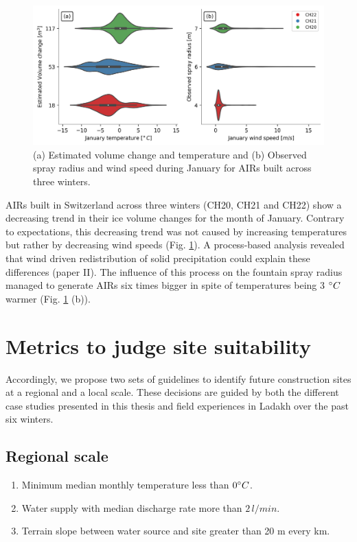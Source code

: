 \begin{figure}[htb]
	\centering
	\includegraphics[width=\textwidth]{figs/CH_diffs.jpg}
	\caption{(a) Estimated volume change and temperature and (b) Observed spray radius and wind speed
		during January for \ac{AIRs} built across three winters. }
	\label{fig:CH_diffs}
\end{figure}

\ac{AIRs} built in Switzerland across three winters (CH20, CH21 and CH22) show a decreasing trend in their ice volume
changes for the month of January. Contrary to expectations, this decreasing trend was not caused by increasing
temperatures but rather by decreasing wind speeds (Fig. \ref{fig:CH_diffs}). A process-based analysis revealed
that wind driven redistribution of solid precipitation could explain these differences (paper II). The influence of this process on
the fountain spray radius managed to generate \ac{AIRs} six times bigger in spite of temperatures being 3 $^{\circ} C$
warmer (Fig. \ref{fig:CH_diffs} (b)).



\section{Metrics to judge site suitability}

Accordingly, we propose two sets of guidelines to identify future construction sites at a regional and a local
scale. These decisions are guided by both the different case studies presented in this thesis and field
experiences in Ladakh over the past six winters.

\subsection{Regional scale}

\begin{enumerate}

	\item Minimum median monthly temperature less than $0 ^{\circ} C$.
	\item Water supply with median discharge rate more than $2\, l/min$.
	\item Terrain slope between water source and site greater than 20 m every km.

\end{enumerate}

